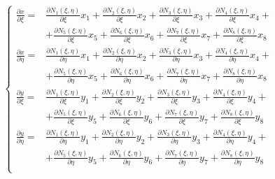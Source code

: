 \documentclass[a4paper]{jpconf}
\begin{document}
\begin{equation}
\begin{cases}
\frac{\partial x}{\partial \xi} = & \frac{\partial N_{1}\left(\xi,\eta\right)}{\partial \xi}x_{1}+\frac{\partial N_{2}\left(\xi,\eta\right)}{\partial \xi}x_{2}+\frac{\partial N_{3}\left(\xi,\eta\right)}{\partial \xi}x_{3}+\frac{\partial N_{4}\left(\xi,\eta\right)}{\partial \xi}x_{4}+\\
& +\frac{\partial N_{5}\left(\xi,\eta\right)}{\partial \xi}x_{5}+\frac{\partial N_{6}\left(\xi,\eta\right)}{\partial \xi}x_{6}+\frac{\partial N_{7}\left(\xi,\eta\right)}{\partial \xi}x_{7}+\frac{\partial N_{8}\left(\xi,\eta\right)}{\partial \xi}x_{8}\\
\frac{\partial x}{\partial \eta} = & \frac{\partial N_{1}\left(\xi,\eta\right)}{\partial \eta}x_{1}+\frac{\partial N_{2}\left(\xi,\eta\right)}{\partial \eta}x_{2}+\frac{\partial N_{3}\left(\xi,\eta\right)}{\partial \eta}x_{3}+\frac{\partial N_{4}\left(\xi,\eta\right)}{\partial \eta}x_{4}+\\
& +\frac{\partial N_{5}\left(\xi,\eta\right)}{\partial \eta}x_{5}+\frac{\partial N_{6}\left(\xi,\eta\right)}{\partial \eta}x_{6}+\frac{\partial N_{7}\left(\xi,\eta\right)}{\partial \eta}x_{7}+\frac{\partial N_{8}\left(\xi,\eta\right)}{\partial \eta}x_{8}\\
\frac{\partial y}{\partial \xi} = & \frac{\partial N_{1}\left(\xi,\eta\right)}{\partial \xi}y_{1}+\frac{\partial N_{2}\left(\xi,\eta\right)}{\partial \xi}y_{2}+\frac{\partial N_{3}\left(\xi,\eta\right)}{\partial \xi}y_{3}+\frac{\partial N_{4}\left(\xi,\eta\right)}{\partial \xi}y_{4}+\\
& +\frac{\partial N_{5}\left(\xi,\eta\right)}{\partial \xi}y_{5}+\frac{\partial N_{6}\left(\xi,\eta\right)}{\partial \xi}y_{6}+\frac{\partial N_{7}\left(\xi,\eta\right)}{\partial \xi}y_{7}+\frac{\partial N_{8}\left(\xi,\eta\right)}{\partial \xi}y_{8}\\
\frac{\partial y}{\partial \eta} = & \frac{\partial N_{1}\left(\xi,\eta\right)}{\partial \eta}y_{1}+\frac{\partial N_{2}\left(\xi,\eta\right)}{\partial \eta}y_{2}+\frac{\partial N_{3}\left(\xi,\eta\right)}{\partial \eta}y_{3}+\frac{\partial N_{4}\left(\xi,\eta\right)}{\partial \eta}y_{4}+\\
& +\frac{\partial N_{5}\left(\xi,\eta\right)}{\partial \eta}y_{5}+\frac{\partial N_{6}\left(\xi,\eta\right)}{\partial \eta}y_{6}+\frac{\partial N_{7}\left(\xi,\eta\right)}{\partial \eta}y_{7}+\frac{\partial N_{8}\left(\xi,\eta\right)}{\partial \eta}y_{8}\\
\end{cases}
\end{equation}
\end{document}
